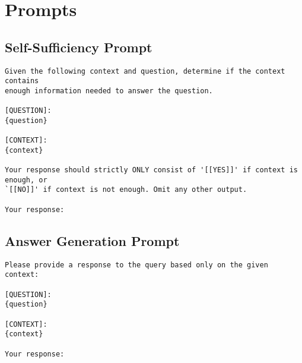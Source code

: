 
\section{Prompts}
\label{app:prompt}






\subsection{Self-Sufficiency Prompt}
\begin{tcolorbox}[title=Self-Sufficiency Prompt, breakable, colback=white, sharp corners, boxrule=0.8pt]
\begin{lstlisting}[basicstyle=\ttfamily\footnotesize, breaklines=true]
Given the following context and question, determine if the context contains 
enough information needed to answer the question. 

[QUESTION]:
{question}

[CONTEXT]:
{context}

Your response should strictly ONLY consist of '[[YES]]' if context is enough, or 
`[[NO]]' if context is not enough. Omit any other output.

Your response:
\end{lstlisting}
\end{tcolorbox}



 
\subsection{Answer Generation Prompt}
\begin{tcolorbox}[title=Answer Generation Prompt, breakable, colback=white, sharp corners, boxrule=0.8pt]
\begin{lstlisting}[basicstyle=\ttfamily\footnotesize, breaklines=true]
Please provide a response to the query based only on the given context:

[QUESTION]:
{question}

[CONTEXT]:
{context}

Your response:
\end{lstlisting}
\end{tcolorbox}



